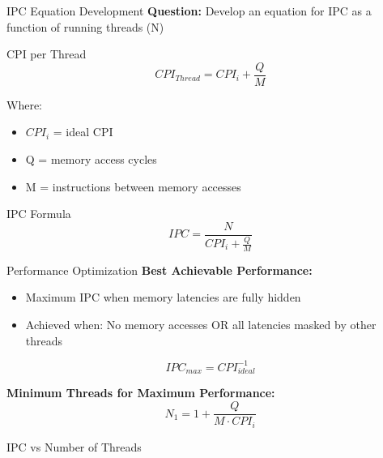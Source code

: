 \documentclass[aspectratio=169,12pt]{beamer}
\begin{document}
\begin{frame}{IPC Equation Development}
\textbf{Question:} Develop an equation for IPC as a function of running threads (N)

\begin{block}{CPI per Thread}
$$CPI_{Thread} = CPI_i + \frac{Q}{M}$$
\end{block}

Where:
\begin{itemize}
    \item $CPI_i$ = ideal CPI
    \item Q = memory access cycles
    \item M = instructions between memory accesses
\end{itemize}

\begin{alertblock}{IPC Formula}
$$IPC = \frac{N}{CPI_i + \frac{Q}{M}}$$
\end{alertblock}
\end{frame}

\begin{frame}{Performance Optimization}
\textbf{Best Achievable Performance:}
\begin{itemize}
    \item Maximum IPC when memory latencies are fully hidden
    \item Achieved when: No memory accesses OR all latencies masked by other threads
\end{itemize}

$$IPC_{max} = CPI_{ideal}^{-1}$$

\textbf{Minimum Threads for Maximum Performance:}
$$N_1 = 1 + \frac{Q}{M \cdot CPI_i}$$
\end{frame}

\begin{frame}{IPC vs Number of Threads}
\begin{center}
\end{center}
\end{frame}
\end{document}
